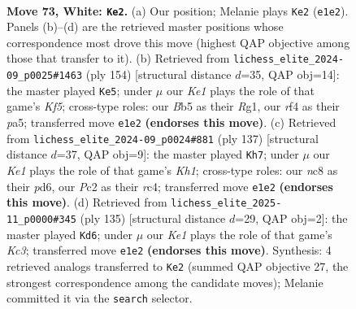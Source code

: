 \documentclass[11pt]{article}
\begin{document}
\clearpage

\begin{figure}[p]\centering
\begin{subfigure}{0.46\textwidth}\centering
\resizebox{\linewidth}{!}{%
\newchessgame
\chessboard[
  setfen={1Rnk4/7p/P7/1BP5/5r2/2p4P/2P3P1/4K3 w - - 9 73},
  showmover=false,
  pgfstyle=straightmove, color=movearrow, markmove={e1-e2}
]}
\caption{}
\end{subfigure}\hfill
\begin{subfigure}{0.46\textwidth}\centering
\resizebox{\linewidth}{!}{%
\newchessgame
\chessboard[
  setfen={6r1/4k1P1/8/p1p2K2/2P5/1P6/P7/6R1 w - - 3 78},
  showmover=false,
  pgfstyle=straightmove, color=movearrow, markmove={f5-e5}
]}
\caption{}
\end{subfigure}
\\[4pt]
\begin{subfigure}{0.46\textwidth}\centering
\resizebox{\linewidth}{!}{%
\newchessgame
\chessboard[
  setfen={7k/6p1/1p1P3p/3r4/2R1N3/3n3P/8/6K1 b - - 2 69},
  showmover=false,
  pgfstyle=straightmove, color=movearrow, markmove={h8-h7}
]}
\caption{}
\end{subfigure}\hfill
\begin{subfigure}{0.46\textwidth}\centering
\resizebox{\linewidth}{!}{%
\newchessgame
\chessboard[
  setfen={r5b1/3P4/2k3p1/7p/N2K3P/6P1/p7/2R5 b - - 13 68},
  showmover=false,
  pgfstyle=straightmove, color=movearrow, markmove={c6-d6}
]}
\caption{}
\end{subfigure}
\caption{\textbf{Move 73, White: \texttt{Ke2}.} (a) Our position; Melanie plays \texttt{Ke2} (\texttt{e1e2}). Panels (b)--(d) are the retrieved master positions whose correspondence most drove this move (highest QAP objective among those that transfer to it). (b) Retrieved from \texttt{lichess\_elite\_2024-09\_p0025\#1463} (ply 154) [structural distance $d$=35, QAP obj=14]: the master played \texttt{Ke5}; under $\mu$ our \emph{Ke1} plays the role of that game's \emph{Kf5}; cross-type roles: our \emph{B}b5 as their \emph{R}g1, our \emph{r}f4 as their \emph{p}a5; transferred move \texttt{e1e2} \textbf{(endorses this move)}. (c) Retrieved from \texttt{lichess\_elite\_2024-09\_p0024\#881} (ply 137) [structural distance $d$=37, QAP obj=9]: the master played \texttt{Kh7}; under $\mu$ our \emph{Ke1} plays the role of that game's \emph{Kh1}; cross-type roles: our \emph{n}c8 as their \emph{p}d6, our \emph{P}c2 as their \emph{r}c4; transferred move \texttt{e1e2} \textbf{(endorses this move)}. (d) Retrieved from \texttt{lichess\_elite\_2025-11\_p0000\#345} (ply 135) [structural distance $d$=29, QAP obj=2]: the master played \texttt{Kd6}; under $\mu$ our \emph{Ke1} plays the role of that game's \emph{Kc3}; transferred move \texttt{e1e2} \textbf{(endorses this move)}. Synthesis: 4 retrieved analogs transferred to \texttt{Ke2} (summed QAP objective 27, the strongest correspondence among the candidate moves); Melanie committed it via the \texttt{search} selector.}
\label{fig:thought-m144}
\end{figure}
\end{document}
